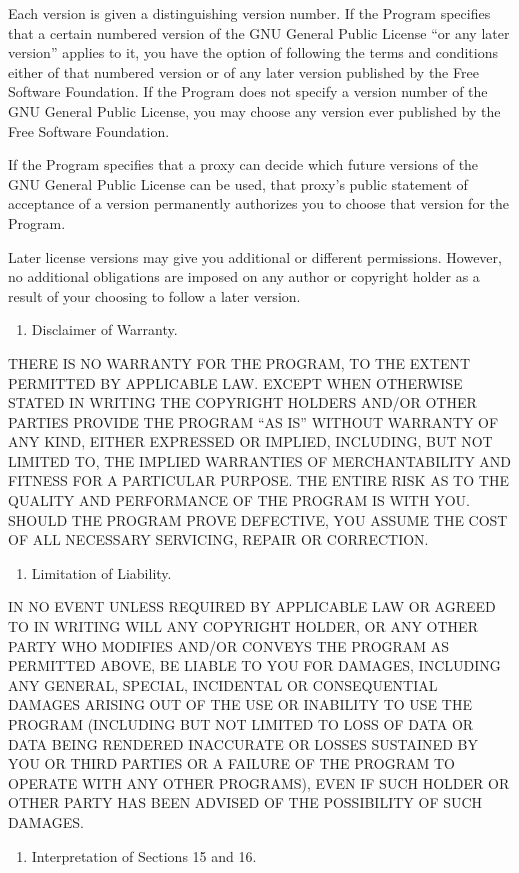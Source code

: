 \documentclass[letterpaper,10pt,english]{sphinxmanual}
\begin{document}
Each version is given a distinguishing version number.  If the
Program specifies that a certain numbered version of the GNU General
Public License “or any later version” applies to it, you have the
option of following the terms and conditions either of that numbered
version or of any later version published by the Free Software
Foundation.  If the Program does not specify a version number of the
GNU General Public License, you may choose any version ever published
by the Free Software Foundation.

If the Program specifies that a proxy can decide which future
versions of the GNU General Public License can be used, that proxy’s
public statement of acceptance of a version permanently authorizes you
to choose that version for the Program.

Later license versions may give you additional or different
permissions.  However, no additional obligations are imposed on any
author or copyright holder as a result of your choosing to follow a
later version.
\begin{enumerate}
%
\setcounter{enumi}{14}
\item {} 
Disclaimer of Warranty.

\end{enumerate}

THERE IS NO WARRANTY FOR THE PROGRAM, TO THE EXTENT PERMITTED BY
APPLICABLE LAW.  EXCEPT WHEN OTHERWISE STATED IN WRITING THE COPYRIGHT
HOLDERS AND/OR OTHER PARTIES PROVIDE THE PROGRAM “AS IS” WITHOUT WARRANTY
OF ANY KIND, EITHER EXPRESSED OR IMPLIED, INCLUDING, BUT NOT LIMITED TO,
THE IMPLIED WARRANTIES OF MERCHANTABILITY AND FITNESS FOR A PARTICULAR
PURPOSE.  THE ENTIRE RISK AS TO THE QUALITY AND PERFORMANCE OF THE PROGRAM
IS WITH YOU.  SHOULD THE PROGRAM PROVE DEFECTIVE, YOU ASSUME THE COST OF
ALL NECESSARY SERVICING, REPAIR OR CORRECTION.
\begin{enumerate}
%
\setcounter{enumi}{15}
\item {} 
Limitation of Liability.

\end{enumerate}

IN NO EVENT UNLESS REQUIRED BY APPLICABLE LAW OR AGREED TO IN WRITING
WILL ANY COPYRIGHT HOLDER, OR ANY OTHER PARTY WHO MODIFIES AND/OR CONVEYS
THE PROGRAM AS PERMITTED ABOVE, BE LIABLE TO YOU FOR DAMAGES, INCLUDING ANY
GENERAL, SPECIAL, INCIDENTAL OR CONSEQUENTIAL DAMAGES ARISING OUT OF THE
USE OR INABILITY TO USE THE PROGRAM (INCLUDING BUT NOT LIMITED TO LOSS OF
DATA OR DATA BEING RENDERED INACCURATE OR LOSSES SUSTAINED BY YOU OR THIRD
PARTIES OR A FAILURE OF THE PROGRAM TO OPERATE WITH ANY OTHER PROGRAMS),
EVEN IF SUCH HOLDER OR OTHER PARTY HAS BEEN ADVISED OF THE POSSIBILITY OF
SUCH DAMAGES.
\begin{enumerate}
%
\setcounter{enumi}{16}
\item {} 
Interpretation of Sections 15 and 16.

\end{enumerate}
\end{document}
